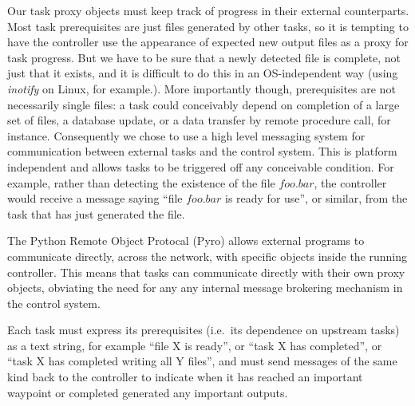 \documentclass[11pt,a4paper]{article}
\begin{document}
Our task proxy objects must keep track of progress in their external
counterparts. Most task prerequisites are just files generated by other
tasks, so it is tempting to have the controller use the appearance of
expected new output files as a proxy for task progress. But we have to
be sure that a newly detected file is complete, not just that it exists,
and it is difficult to do this in an OS-independent way (using {\em
inotify} on Linux, for example.). 
More importantly though, prerequisites are not necessarily single files:
a task could conceivably depend on completion of a large set of files, a
database update, or a data transfer by remote procedure call, for
instance. Consequently we chose to use a high level messaging system for
communication between external tasks and the control system. This is
platform independent and allows tasks to be triggered off any
conceivable condition. For example, rather than detecting the existence
of the file $foo.bar$, the controller would receive a message saying
``file $foo.bar$ is ready for use'', or similar, from the task that has
just generated the file.

The Python Remote Object Protocal (Pyro) allows external programs to
communicate directly, across the network, with specific objects inside
the running controller. This means that tasks can communicate directly
with their own proxy objects, obviating the need for any any internal
message brokering mechanism in the control system.    

Each task must express its prerequisites (i.e.\ its dependence on
upstream tasks) as a text string, for example ``file X is ready'', or
``task X has completed'', or ``task X has completed writing all Y
files'', and must send messages of the same kind back to the controller
to indicate when it has reached an important waypoint or completed
generated any important outputs.  
\end{document}
